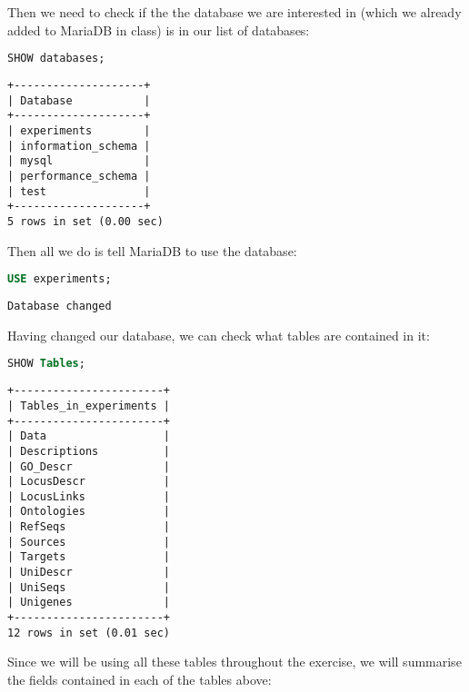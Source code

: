 Then we need to check if the the database we are interested in (which we already added to MariaDB in class) is in our list of databases:
\begin{lstlisting}[language=sql]
SHOW databases;
\end{lstlisting}

\begin{lstlisting}[style=output]
+--------------------+
| Database           |
+--------------------+
| experiments        |
| information_schema |
| mysql              |
| performance_schema |
| test               |
+--------------------+
5 rows in set (0.00 sec)
\end{lstlisting}

Then all we do is tell MariaDB to use the  database:
\begin{lstlisting}[language=sql]
USE experiments;
\end{lstlisting}

\begin{lstlisting}[style=output]
Database changed
\end{lstlisting}

Having changed our database, we can check what tables are contained in it:
\begin{lstlisting}[language=sql]
SHOW Tables;
\end{lstlisting}

\begin{lstlisting}[style=output]
+-----------------------+
| Tables_in_experiments |
+-----------------------+
| Data                  |
| Descriptions          |
| GO_Descr              |
| LocusDescr            |
| LocusLinks            |
| Ontologies            |
| RefSeqs               |
| Sources               |
| Targets               |
| UniDescr              |
| UniSeqs               |
| Unigenes              |
+-----------------------+
12 rows in set (0.01 sec)
\end{lstlisting}

Since we will be using all these tables throughout the exercise, we will summarise the fields contained in each of the tables above:

